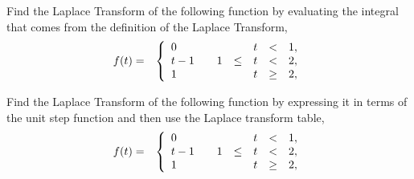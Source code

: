 \begin{problem}
\clearpage

\item Find the Laplace Transform of the following function by
  evaluating the integral that comes from the definition of the
  Laplace Transform,
  \begin{eqnarray}
      f(t) & = & \left\{
        \begin{array}{l@{\hspace{2em}}rcccl}
          0   &    &  & t & < & 1, \\
          t-1 &  1 & \leq & t & < & 2, \\
          1   &    &      & t & \geq & 2, \\
        \end{array}
      \right.
  \end{eqnarray}
  \vfill

\item Find the Laplace Transform of the following function by
  expressing it in terms of the unit step function and then use the
  Laplace transform table,
  \begin{eqnarray}
      f(t) & = & \left\{
        \begin{array}{l@{\hspace{2em}}rcccl}
          0   &    &  & t & < & 1, \\
          t-1 &  1 & \leq & t & < & 2, \\
          1   &    &      & t & \geq & 2, \\
        \end{array}
      \right.
  \end{eqnarray}
  \vfill

\end{problem}

